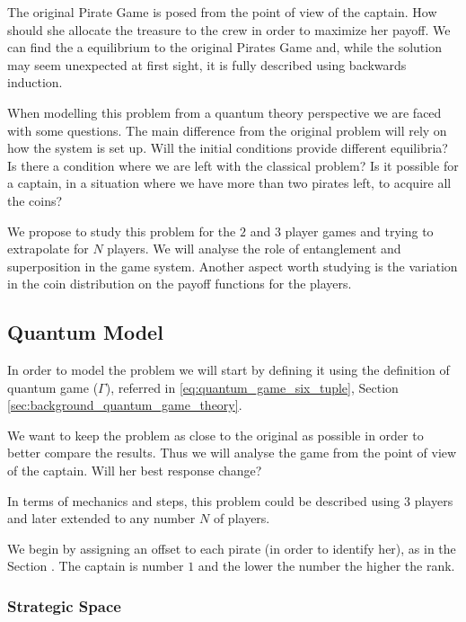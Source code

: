 The original Pirate Game is posed from the point of view of the captain. How should she allocate the treasure to the crew in order to maximize her payoff.
We can find the a equilibrium to the original Pirates Game and, while the solution may seem unexpected at first sight, it is fully described using backwards induction. 

When modelling this problem from a quantum theory perspective we are faced with some questions. The main difference from the original problem will rely on how the system is set up. Will the initial conditions provide different equilibria? Is there a condition where we are left with the classical problem? Is it possible for a captain, in a situation where we have more than two pirates left, to acquire all the coins?

We propose to study this problem for the $2$ and $3$ player games and trying to extrapolate for $N$ players. We will analyse the role of entanglement and superposition in the game system. Another aspect worth studying is the variation in the coin distribution on the payoff functions for the players.



\subsection{Quantum Model}
\label{subsec:description_2}

In order to model the problem we will start by defining it using the definition of quantum game ($\Gamma$), referred in \ref{eq:quantum_game_six_tuple}, Section \ref{sec:background_quantum_game_theory}\cite{Fra2011a}. 

We want to keep the problem as close to the original as possible in order to better compare the results. Thus we will analyse the game from the point of view of the captain. Will her best response change?

In terms of mechanics and steps, this problem could be described using $3$ players and later extended to any number $N$ of players. 

We begin by assigning an offset to each pirate (in order to identify her), as in the Section \label{subsec:description}. The captain is number $1$ and the lower the number the higher the rank. 


\subsubsection{Strategic Space}
\label{subsec:strategic_space}

